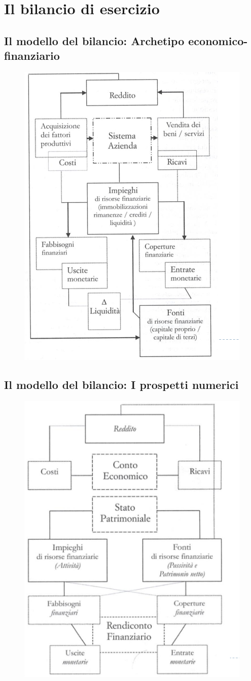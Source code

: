\section{Il bilancio di esercizio}
\subsection{Il modello del bilancio: Archetipo economico-finanziario}

\begin{figure}[H]
    \centering
    \includegraphics[width=0.4\linewidth]{2/img/Screenshot from 2022-07-09 16-49-15.png}
\end{figure}

\subsection{Il modello del bilancio: I prospetti numerici}


\begin{figure}[H]
    \centering
    \includegraphics[width=0.4\linewidth]{2/img/Screenshot from 2022-07-09 16-50-17.png}
\end{figure}

